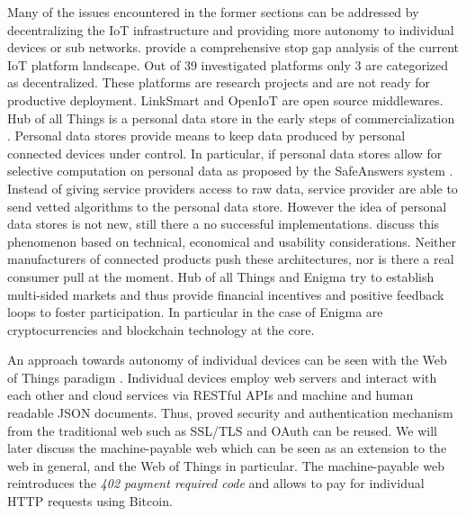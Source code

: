 Many of the issues encountered in the former sections can be addressed by decentralizing the IoT infrastructure and providing more autonomy to individual devices or sub networks. \cite{ISI:000379632700002} provide a comprehensive stop gap analysis of the current IoT platform landscape. Out of 39 investigated platforms only 3 are categorized as decentralized. These platforms are research projects and are not ready for productive deployment. LinkSmart and OpenIoT are open source middlewares. Hub of all Things is a personal data store in the early steps of commercialization \parencite{ng2014engineering}. Personal data stores provide means to keep data produced by personal connected devices under control. In particular, if personal data stores allow for selective computation on personal data as proposed by the SafeAnswers system \parencite{10.1371/journal.pone.0098790}. Instead of giving service providers access to raw data, service provider are able to send vetted algorithms to the personal data store. However the idea of personal data stores is not new, still there a no successful implementations. \cite{DBLP:journals/corr/abs-1202-4503} discuss this phenomenon based on technical, economical and usability considerations. Neither manufacturers of connected products push these architectures, nor is there a real consumer pull at the moment. Hub of all Things and Enigma \parencite{7163223} try to establish multi-sided markets and thus provide financial incentives and positive feedback loops to foster participation. In particular in the case of Enigma are cryptocurrencies and blockchain technology at the core.

An approach towards autonomy of individual devices can be seen with the Web of Things paradigm \parencite{Guinard2011}. Individual devices employ web servers and interact with each other and cloud services via RESTful APIs and machine and human readable JSON documents. Thus, proved security and authentication mechanism from the traditional web such as SSL/TLS and OAuth \parencite{Leiba2012} can be reused. We will later discuss the machine-payable web which can be seen as an extension to the web in general, and the Web of Things in particular. The machine-payable web reintroduces the \emph{402 payment required code} and allows to pay for individual HTTP requests using Bitcoin. 

